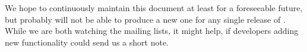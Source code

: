 We hope to continuously maintain this document at least for a foreseeable future, but
probably will not be able to produce a new one for any single release of {\FlightGear}.
While we are both watching the mailing lists, it might help, if developers adding new
functionality could send us a short note.



